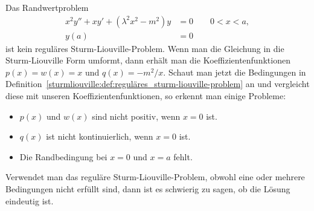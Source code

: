 \begin{beispiel}
	Das Randwertproblem
	\begin{equation}
		\begin{aligned}
		x^2y'' + xy' + (\lambda^2x^2 - m^2)y &= 0 \qquad 0<x<a,\\
		y(a) &= 0
		\end{aligned}
	\end{equation}
	ist kein reguläres Sturm-Liouville-Problem.
	Wenn man die Gleichung in die Sturm-Liouville Form umformt, dann
	erhält man
	die Koeffizientenfunktionen $p(x) = w(x) = x$ und $q(x) = -m^2/x$.
	Schaut man jetzt die Bedingungen in
	Definition~\ref{sturmliouville:def:reguläres_sturm-liouville-problem} an und 
	vergleicht diese mit unseren Koeffizientenfunktionen, so erkennt man einige
	Probleme:
	\begin{itemize}
		\item $p(x)$ und $w(x)$ sind nicht positiv, wenn $x = 0$ ist.
		\item $q(x)$ ist nicht kontinuierlich, wenn $x = 0$ ist.
		\item Die Randbedingung bei $x = 0$ und $x = a$ fehlt.
	\end{itemize}
\end{beispiel}

Verwendet man das reguläre Sturm-Liouville-Problem, obwohl eine oder mehrere
Bedingungen nicht erfüllt sind, dann ist es schwierig zu sagen, ob die Lösung
eindeutig ist.
